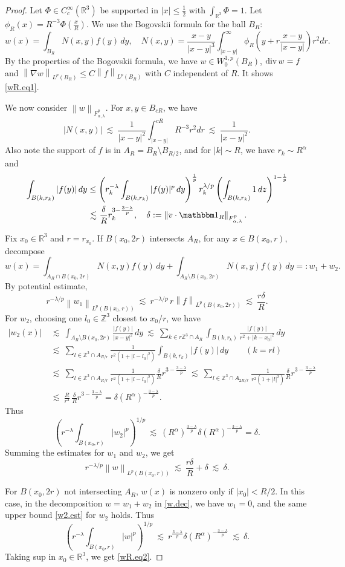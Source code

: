 \documentclass[11pt]{article}
\numberwithin{equation}{section}
\theoremstyle{remark}
\theoremstyle{definition}
\newcommand{\bke}[1]{\left ( #1 \right )}
\newcommand{\norm}[1]{\left \| #1 \right \|}
\newcommand{\R}{\mathbb{R}}
\renewcommand{\div}{\mathop{\rm div}\nolimits}
\newcommand\de{\delta}
\newcommand{\nb}{\nabla}
\newcommand{\lec}{{\ \lesssim \ }}
\newcommand\al{\alpha}
\newcommand\la{\lambda}
\newcommand{\ZZ}{\mathbb{Z}}
\newcommand{\EQ}[1]{\begin{equation} #1 \end{equation}}
\newcommand{\EQS}[1]{\begin{equation}\begin{split} #1 \end{split}\end{equation}}
\begin{document}
\begin{proof} Let $\Phi\in C^\infty_c(\R^3)$ be supported in $|x|\le \frac 12$ with
$\int_{\R^3} \Phi=1$. Let $\phi_R(x) =R^{-3} \Phi(\frac xR)$.
We use the Bogovskii formula for the ball $B_{R}$:
\EQ{
w(x)=\int_{B_R}  N(x,y)f(y)\,dy, \quad N(x,y)=\frac {x-y}{|x-y|^3} \int_{|x-y|}^\infty \phi_R\bke{y+r \frac {x-y}{|x-y|}}r^2 dr.
}
By the properties of the Bogovskii formula, we have $w \in W^{1,p}_0(B_R)$, $\div w= f$ and $\norm{\nb w}_{L^p(B_R)} \le C \norm{f}_{L^p(B_R)}$ with $C$ independent of $R$. It shows \eqref{wR.eq1}.

We now consider
$ \norm{w}_{F^p_{\al,\la}}$. For $x,y\in B_{cR}$, we have
\[
|N(x,y)| \lec \frac {1}{|x-y|^2} \int_{|x-y|}^{cR} R^{-3} r^2 dr\lec \frac {1}{|x-y|^2}.
\]
Also note the support of $f$ is in $A_R=B_R \setminus B_{R/2}$, and for $|k| \sim R$, we have $r_k \sim R^\al$ and
\EQS{
\int_{B(k,r_k)}|f(y)|\,dy &\le \bke{ r_k^{-\la} \int_{B(k,r_k)}|f(y)|^p\,dy}^{\frac 1p} r_k^{\la/p}   \bke{\int_{B(k,r_k)}1\,dz}^{1-\frac 1p}
\\
&
\lec \frac {\de}R  r_k ^{3-\frac{3-\la}p}, \quad \de:=  \norm{v\cdot \mathbbm 1_R}_{F^p_{\al,\la}} .
}

Fix $x_0 \in \R^3$ and $r=r_{x_0}$.
If $B(x_0,2r)$ intersects $A_R$, for any $x \in B(x_0,r)$, decompose
\EQ{\label{w.dec}
w(x) = \int_{A_R\cap B(x_0,2r)}  N(x,y)f(y)\,dy+\int_{A_R\setminus  B(x_0,2r) }  N(x,y)f(y)\,dy=: w_1+w_2.
}
By potential estimate,
\[
r^{-\la/p} \norm{w_1}_{L^p(B(x_0,r))} \lec r^{-\la/p}\, r \norm{f}_{L^p(B(x_0,2r))}
\lec \frac {r\de}R.
\]
For $w_2$, choosing one $l_0\in \ZZ^3$ closest to $x_0/r$, we have
\begin{align}
\nonumber
|w_2(x)|
&\lec \int_{A_R\setminus  B(x_0,2r) }  \frac  {|f(y)|}{|x-y|^2}\,dy
\lec \sum_{k \in r \ZZ^3 \cap A_R}\int_{B(k,r_k)} \frac  {|f(y)|}{r^2+|k-x_0|^2}\,dy
\\
&\lec  \sum_{l \in  \ZZ^3 \cap A_{R/r}}\frac  {1}{r^2(1+|l-l_0|^2)} \int_{B(k,r_k)}|f(y)|\,dy \qquad (k=rl)
\nonumber
\\
&\lec \sum_{l \in  \ZZ^3 \cap A_{R/r}}\frac  {1}{r^2(1+|l-l_0|^2)} \frac {\de}R  r ^{3-\frac{3-\la}p}
\lec \sum_{l \in  \ZZ^3 \cap A_{2R/r}}\frac  {1}{r^2(1+|l|^2)} \frac {\de}R  r ^{3-\frac{3-\la}p}
\nonumber
\\
&\lec \frac R{r^3} \,\frac {\de}R  r ^{3-\frac{3-\la}p} = \de (R^\al) ^{-\frac{3-\la}p}.
\label{w2.est}
\end{align}
Thus
\[
\bke{r^{-\la} \int_{B(x_0,r)} |w_2|^p }^{1/p} \lec (R^\al) ^{\frac{3-\la}p}\de (R^\al) ^{-\frac{3-\la}p}
= \de .
\]
Summing the estimates for $w_1$ and $w_2$, we get
\[
r^{-\la/p} \norm{w}_{L^p(B(x_0,r))} \lec \frac {r\de}R+ \de \lec \de.
\]

For $B(x_0,2r)$ not intersecting $A_R$, $w(x)$ is nonzero only if $|x_0|<R/2$. In this case, in the decomposition $w=w_1+w_2$ in \eqref{w.dec}, we have $w_1=0$, and the same upper bound \eqref{w2.est} for $w_2$ holds.  Thus
\[
\bke{r^{-\la} \int_{B(x_0,r)} |w|^p }^{1/p} \lec r ^{\frac{3-\la}p}\de (R^\al) ^{-\frac{3-\la}p}
\lec \de.
\]
Taking sup in $x_0\in \R^3$, we get \eqref{wR.eq2}.
\end{proof}
\end{document}
